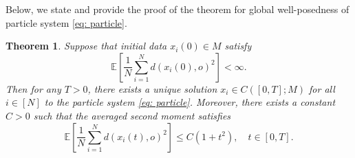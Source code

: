 \documentclass[11pt]{amsart}
\newtheorem{theorem}{Theorem}[section]
\newcommand{\bE}{\mathbb{E}}
\newcommand{\p}{o}%
\newcommand{\dist}{d}%
\begin{document}
Below, we state and provide the proof of the theorem for global well-posedness of  particle system \eqref{eq: particle}.


\begin{theorem} \label{thm:T3.1}
Suppose that initial data $x_i(0)\in M$ satisfy
\[
\bE\left[ \frac{1}{N}\sum_{i=1}^N\dist(x_i(0), \p)^2\right]<\infty.
\]
Then for any $T>0$, there exists a unique solution $x_i \in C([0,T]; M)$ for all $i\in [N]$ to the particle system \eqref{eq: particle}. Moreover, there exists a constant $C>0$ such that the averaged second moment satisfies
    \begin{equation*}
        \bE\left[ \frac{1}{N}\sum_{i=1}^N\dist(x_i(t), \p)^2\right]\leq  C(1+t^2),\quad t\in [0,T].
    \end{equation*}
\end{theorem}
\end{document}

